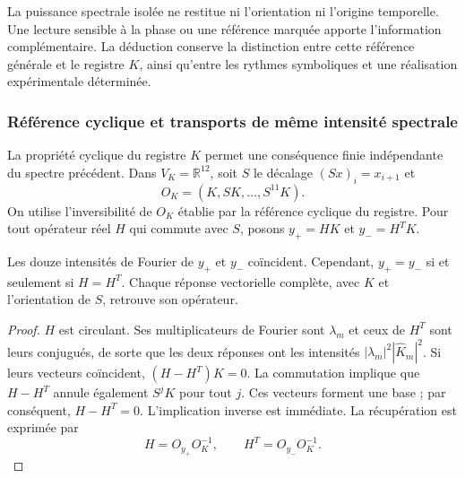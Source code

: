 La puissance spectrale isolée ne restitue ni l'orientation ni l'origine temporelle. Une lecture sensible à la phase ou une référence marquée apporte l'information complémentaire. La déduction conserve la distinction entre cette référence générale et le registre $K$, ainsi qu'entre les rythmes symboliques et une réalisation expérimentale déterminée.

\subsubsection{Référence cyclique et transports de même intensité spectrale}
\label{md:cron:k-ciclico}

La propriété cyclique du registre $K$ permet une conséquence finie
indépendante du spectre précédent. Dans $V_K=\mathbb R^{12}$, soit $S$ le
décalage $(Sx)_i=x_{i+1}$ et
\begin{equation}
 O_K=(K,SK,\ldots,S^{11}K).
 \label{md:cron:matriz-ciclica}
\end{equation}
On utilise l’inversibilité de $O_K$ établie par la référence cyclique
du registre. Pour tout opérateur réel $H$ qui commute avec $S$,
posons $y_+=HK$ et $y_-=H^TK$.

\begin{proposition}
\label{md:cron:proposicion-intensidades}
Les douze intensités de Fourier de $y_+$ et $y_-$ coïncident.
Cependant, $y_+=y_-$ si et seulement si $H=H^T$.
Chaque réponse vectorielle complète, avec $K$ et l’orientation de $S$,
retrouve son opérateur.
\end{proposition}
\begin{proof}
$H$ est circulant. Ses multiplicateurs de Fourier sont $\lambda_m$ et ceux
de $H^T$ sont leurs conjugués, de sorte que les deux réponses ont
les intensités $|\lambda_m|^2|\widehat K_m|^2$.
Si leurs vecteurs coïncident, $(H-H^T)K=0$. La commutation implique que
$H-H^T$ annule également $S^jK$ pour tout $j$. Ces vecteurs forment une base ;
par conséquent, $H-H^T=0$. L’implication inverse est immédiate.
La récupération est exprimée par
\begin{equation}
 H=O_{y_+}O_K^{-1},\qquad
 H^T=O_{y_-}O_K^{-1}.
 \label{md:cron:restitucion-operador}
\end{equation}
\end{proof}

